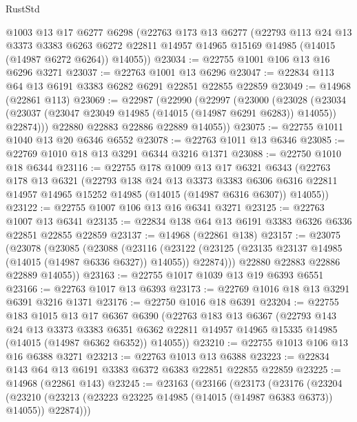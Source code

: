 \begin{lexlean}{RustStd}
\begin{coremodule}
    @1003
    @13
    @17
    @6277
    @6298
    (@22763
      @173
      @13
      @6277
      (@22793
        @113
        @24
        @13
        @3373
        @3383
        @6263
        @6272
        @22811
        @14957
        @14965
        @15169
        @14985
        (@14015 (@14987 @6272 @6264))
        @14055))
@23034 := @22755 @1001 @106 @13 @16 @6296 @3271
@23037 := @22763 @1001 @13 @6296
@23047 := @22834 @113 @64 @13 @6191 @3383 @6282 @6291 @22851 @22855 @22859
@23049 := @14968 (@22861 @113)
@23069 := @22987
    (@22990
      (@22997
        (@23000
          (@23028
            (@23034 (@23037 (@23047 @23049 @14985 (@14015 (@14987 @6291 @6283)) @14055)) @22874)))
        @22880
        @22883
        @22886
        @22889
        @14055))
@23075 := @22755 @1011 @1040 @13 @20 @6346 @6552
@23078 := @22763 @1011 @13 @6346
@23085 := @22769 @1010 @18 @13 @3291 @6344 @3216 @1371
@23088 := @22750 @1010 @18 @6344
@23116 := @22755
    @178
    @1009
    @13
    @17
    @6321
    @6343
    (@22763
      @178
      @13
      @6321
      (@22793
        @138
        @24
        @13
        @3373
        @3383
        @6306
        @6316
        @22811
        @14957
        @14965
        @15252
        @14985
        (@14015 (@14987 @6316 @6307))
        @14055))
@23122 := @22755 @1007 @106 @13 @16 @6341 @3271
@23125 := @22763 @1007 @13 @6341
@23135 := @22834 @138 @64 @13 @6191 @3383 @6326 @6336 @22851 @22855 @22859
@23137 := @14968 (@22861 @138)
@23157 := @23075
    (@23078
      (@23085
        (@23088
          (@23116
            (@23122 (@23125 (@23135 @23137 @14985 (@14015 (@14987 @6336 @6327)) @14055)) @22874)))
        @22880
        @22883
        @22886
        @22889
        @14055))
@23163 := @22755 @1017 @1039 @13 @19 @6393 @6551
@23166 := @22763 @1017 @13 @6393
@23173 := @22769 @1016 @18 @13 @3291 @6391 @3216 @1371
@23176 := @22750 @1016 @18 @6391
@23204 := @22755
    @183
    @1015
    @13
    @17
    @6367
    @6390
    (@22763
      @183
      @13
      @6367
      (@22793
        @143
        @24
        @13
        @3373
        @3383
        @6351
        @6362
        @22811
        @14957
        @14965
        @15335
        @14985
        (@14015 (@14987 @6362 @6352))
        @14055))
@23210 := @22755 @1013 @106 @13 @16 @6388 @3271
@23213 := @22763 @1013 @13 @6388
@23223 := @22834 @143 @64 @13 @6191 @3383 @6372 @6383 @22851 @22855 @22859
@23225 := @14968 (@22861 @143)
@23245 := @23163
    (@23166
      (@23173
        (@23176
          (@23204
            (@23210 (@23213 (@23223 @23225 @14985 (@14015 (@14987 @6383 @6373)) @14055)) @22874)))

\end{coremodule}
\end{lexlean}
